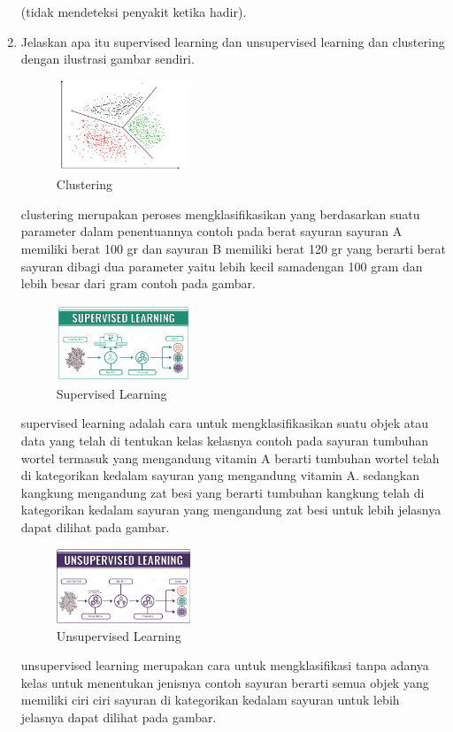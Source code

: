 \begin{enumerate}
	(tidak mendeteksi penyakit ketika hadir).
	\item Jelaskan apa itu supervised learning dan unsupervised learning dan clustering dengan ilustrasi gambar sendiri.
	\hfill\break
	\begin{figure}[H]
		\includegraphics[width=4cm]{figures/1174003/2/clustering.jpg}
		\centering
		\caption{Clustering}
	\end{figure}
	\hfill\break
	clustering merupakan peroses mengklasifikasikan yang berdasarkan suatu parameter dalam penentuannya contoh pada berat sayuran sayuran A memiliki berat 100 gr dan sayuran B memiliki berat 120 gr yang berarti berat sayuran dibagi dua parameter yaitu lebih kecil samadengan 100 gram dan lebih besar dari gram contoh pada gambar.
		\begin{figure}[H]
		\includegraphics[width=4cm]{figures/1174003/2/supervised.png}
		\centering
		\caption{Supervised Learning}
	\end{figure}
	\hfill\break
	supervised learning adalah cara untuk mengklasifikasikan suatu objek atau data yang telah di tentukan kelas kelasnya contoh pada sayuran tumbuhan wortel termasuk yang mengandung vitamin A berarti tumbuhan wortel telah di kategorikan kedalam sayuran yang mengandung vitamin A. sedangkan kangkung mengandung zat besi yang berarti tumbuhan kangkung telah di kategorikan kedalam sayuran yang mengandung zat besi untuk lebih jelasnya dapat dilihat pada gambar.
		\begin{figure}[H]
		\includegraphics[width=4cm]{figures/1174003/2/unsupervised.png}
		\centering
		\caption{Unsupervised Learning}
	\end{figure}
	\hfill\break
	unsupervised learning merupakan cara untuk mengklasifikasi tanpa adanya kelas untuk menentukan jenisnya contoh sayuran berarti semua objek yang memiliki ciri ciri sayuran di kategorikan kedalam sayuran untuk lebih jelasnya dapat dilihat pada gambar.

\end{enumerate}
